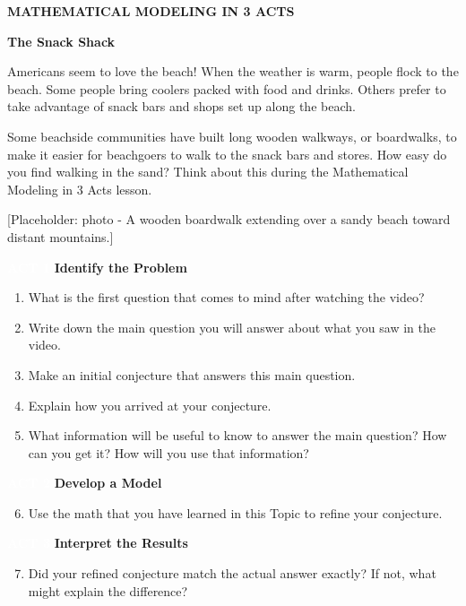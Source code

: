 \documentclass{article}
\newcommand{\placeholder}[2]{[Placeholder: #1 - #2]}
\begin{document}
\clearpage

\textbf{\Large MATHEMATICAL MODELING IN 3 ACTS}

\textbf{\LARGE The Snack Shack}

Americans seem to love the beach! When the weather is warm, people flock to the beach. Some people bring coolers packed with food and drinks. Others prefer to take advantage of snack bars and shops set up along the beach.

Some beachside communities have built long wooden walkways, or boardwalks, to make it easier for beachgoers to walk to the snack bars and stores. How easy do you find walking in the sand? Think about this during the Mathematical Modeling in 3 Acts lesson.

\placeholder{photo}{A wooden boardwalk extending over a sandy beach toward distant mountains.}

\vspace{1em}

\colorbox{blue!80}{\textcolor{white}{\textbf{ACT 1}}} \quad \textbf{Identify the Problem}

\begin{enumerate}
    \item What is the first question that comes to mind after watching the video?
    \item Write down the main question you will answer about what you saw in the video.
    \item Make an initial conjecture that answers this main question.
    \item Explain how you arrived at your conjecture.
    \item What information will be useful to know to answer the main question? How can you get it? How will you use that information?
\end{enumerate}

\vspace{1em}

\colorbox{blue!80}{\textcolor{white}{\textbf{ACT 2}}} \quad \textbf{Develop a Model}

\begin{enumerate}
    \setcounter{enumi}{5}
    \item Use the math that you have learned in this Topic to refine your conjecture.
\end{enumerate}

\vspace{1em}

\colorbox{blue!80}{\textcolor{white}{\textbf{ACT 3}}} \quad \textbf{Interpret the Results}

\begin{enumerate}
    \setcounter{enumi}{6}
    \item Did your refined conjecture match the actual answer exactly? If not, what might explain the difference?
\end{enumerate}
\end{document}
